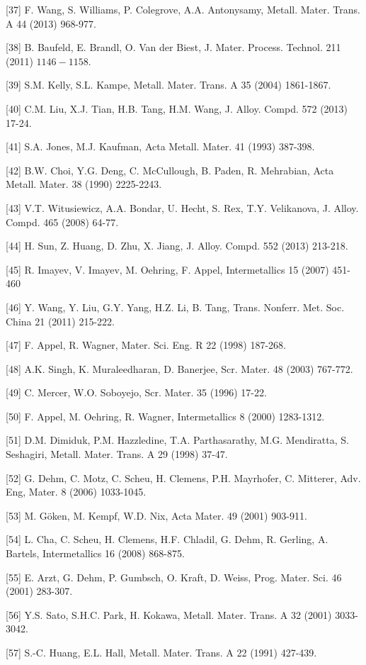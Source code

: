 \documentclass[10pt]{article}
\begin{document}
[37] F. Wang, S. Williams, P. Colegrove, A.A. Antonysamy, Metall. Mater. Trans. A 44 (2013) 968-977.

[38] B. Baufeld, E. Brandl, O. Van der Biest, J. Mater. Process. Technol. 211 (2011) $1146-1158$.

[39] S.M. Kelly, S.L. Kampe, Metall. Mater. Trans. A 35 (2004) 1861-1867.

[40] C.M. Liu, X.J. Tian, H.B. Tang, H.M. Wang, J. Alloy. Compd. 572 (2013) 17-24.

[41] S.A. Jones, M.J. Kaufman, Acta Metall. Mater. 41 (1993) 387-398.

[42] B.W. Choi, Y.G. Deng, C. McCullough, B. Paden, R. Mehrabian, Acta Metall. Mater. 38 (1990) 2225-2243.

[43] V.T. Witusiewicz, A.A. Bondar, U. Hecht, S. Rex, T.Y. Velikanova, J. Alloy. Compd. 465 (2008) 64-77.

[44] H. Sun, Z. Huang, D. Zhu, X. Jiang, J. Alloy. Compd. 552 (2013) 213-218.

[45] R. Imayev, V. Imayev, M. Oehring, F. Appel, Intermetallics 15 (2007) 451-460

[46] Y. Wang, Y. Liu, G.Y. Yang, H.Z. Li, B. Tang, Trans. Nonferr. Met. Soc. China 21 (2011) 215-222.

[47] F. Appel, R. Wagner, Mater. Sci. Eng. R 22 (1998) 187-268.

[48] A.K. Singh, K. Muraleedharan, D. Banerjee, Scr. Mater. 48 (2003) 767-772.

[49] C. Mercer, W.O. Soboyejo, Scr. Mater. 35 (1996) 17-22.

[50] F. Appel, M. Oehring, R. Wagner, Intermetallics 8 (2000) 1283-1312.

[51] D.M. Dimiduk, P.M. Hazzledine, T.A. Parthasarathy, M.G. Mendiratta, S. Seshagiri, Metall. Mater. Trans. A 29 (1998) 37-47.

[52] G. Dehm, C. Motz, C. Scheu, H. Clemens, P.H. Mayrhofer, C. Mitterer, Adv. Eng, Mater. 8 (2006) 1033-1045.

[53] M. Göken, M. Kempf, W.D. Nix, Acta Mater. 49 (2001) 903-911.

[54] L. Cha, C. Scheu, H. Clemens, H.F. Chladil, G. Dehm, R. Gerling, A. Bartels, Intermetallics 16 (2008) 868-875.

[55] E. Arzt, G. Dehm, P. Gumbsch, O. Kraft, D. Weiss, Prog. Mater. Sci. 46 (2001) 283-307.

[56] Y.S. Sato, S.H.C. Park, H. Kokawa, Metall. Mater. Trans. A 32 (2001) 3033-3042.

[57] S.-C. Huang, E.L. Hall, Metall. Mater. Trans. A 22 (1991) 427-439.
\end{document}
